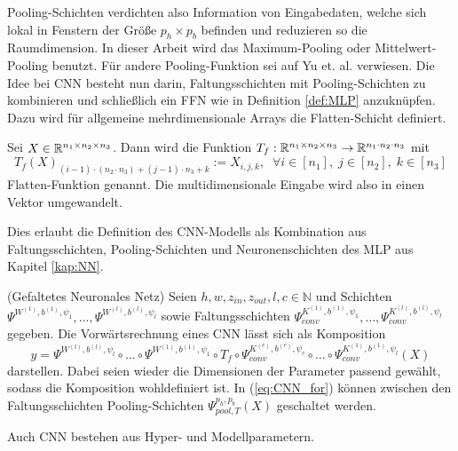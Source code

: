 Pooling-Schichten verdichten also Information von Eingabedaten, welche sich lokal in Fenstern der Größe $p_h \times p_b$ befinden und reduzieren so die Raumdimension. In dieser Arbeit wird das Maximum-Pooling oder Mittelwert-Pooling benutzt. Für andere Pooling-Funktion sei auf Yu et. al.\cite{yu2014mixed} verwiesen.
Die Idee bei CNN besteht nun darin, Faltungsschichten mit Pooling-Schichten zu kombinieren und schließlich ein FFN wie in Definition \ref{def:MLP} anzuknüpfen.
Dazu wird für allgemeine mehrdimensionale Arrays die Flatten-Schicht definiert.

\begin{defi}
    \label{def:flatten}
    Sei $X \in \mathbb{R}^{n_1 \times n_2 \times n_3}$. Dann wird die Funktion $T_f:\mathbb{R}^{n_1 \times n_2 \times n_3} \rightarrow \mathbb{R}^{n_1 \cdot n_2 \cdot n_3}$ mit 
    \begin{equation*}
        T_f(X)_{(i-1) \cdot (n_2 \cdot n_3)+(j-1) \cdot n_3+k}:= X_{i,j,k}, \; \; \forall i \in [n_1],\; j \in [n_2],\; k \in [n_3]
    \end{equation*}
    Flatten-Funktion genannt. Die multidimensionale Eingabe wird also in einen Vektor umgewandelt.
\end{defi}

Dies erlaubt die Definition des CNN-Modells als Kombination aus Faltungsschichten, Pooling-Schichten und Neuronenschichten des MLP aus Kapitel \ref{kap:NN}. 
\begin{defi}(Gefaltetes Neuronales Netz)
    \label{def_fw_cnn}
    Seien $h, w, z_{in}, z_{out}, l ,c \in \mathbb{N}$ und Schichten $\Psi^{W^{(1)},b^{(1)},\psi_{1}}, \ldots, \Psi^{W^{(l)},b^{(l)},\psi_{l}}$ sowie Faltungsschichten $\Psi_{conv}^{K^{(1)},b^{(1)},\psi_{1}}, \ldots, \Psi_{conv}^{K^{(l)},b^{(l)},\psi_{l}}$ gegeben. Die Vorwärtsrechnung eines CNN lässt sich als Komposition
    \begin{equation}
        \label{eq:CNN_for}
        y=\Psi^{W^{(l)},b^{(l)},\psi_{l}} \circ \ldots \circ \Psi^{W^{(1)},b^{(1)},\psi_{1}} \circ T_f \circ \Psi_{conv}^{K^{(c)},b^{(c)},\psi_{c}} \circ \ldots \circ \Psi_{conv}^{K^{(1)},b^{(1)},\psi_{l}}(X)
    \end{equation} 
    darstellen. Dabei seien wieder die Dimensionen der Parameter passend gewählt, sodass die Komposition wohldefiniert ist. In (\ref{eq:CNN_for}) können zwischen den Faltungsschichten Pooling-Schichten $\Psi_{pool,T}^{p_h,p_b}(X)$ geschaltet werden.
\end{defi}
Auch CNN bestehen aus Hyper- und Modellparametern.

